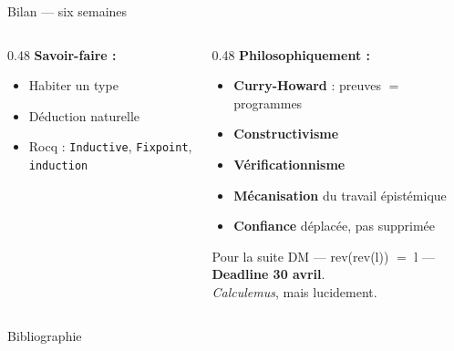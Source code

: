 \documentclass[aspectratio=169]{beamer}
\begin{document}
\begin{frame}{Bilan — six semaines}
  \begin{columns}[T]
    \begin{column}{0.48\textwidth}
      \textbf{Savoir-faire :}
      \begin{itemize}
        \item Habiter un type
        \item Déduction naturelle
        \item Rocq : \texttt{Inductive}, \texttt{Fixpoint}, \texttt{induction}
      \end{itemize}
    \end{column}
    \begin{column}{0.48\textwidth}
      \textbf{Philosophiquement :}
      \begin{itemize}
        \item \textbf{Curry-Howard} : preuves $=$ programmes
        \item \textbf{Constructivisme}
        \item \textbf{Vérificationnisme}
        \item \textbf{Mécanisation} du travail épistémique
        \item \textbf{Confiance} déplacée, pas supprimée
      \end{itemize}
      \medskip
      \begin{block}{Pour la suite}
        \small
        DM — rev(rev(l)) $=$ l — \textbf{Deadline 30 avril}.\\
        \emph{Calculemus}, mais lucidement.
      \end{block}
    \end{column}
  \end{columns}
\end{frame}

\begin{frame}[allowframebreaks]{Bibliographie}
  \tiny
  \printbibliography[heading=none]
\end{frame}
\end{document}
